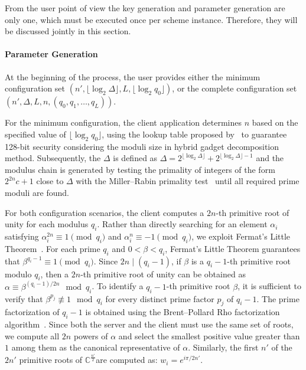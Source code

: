 From the user point of view the key generation and parameter generation are only one, which must be executed once per scheme instance. Therefore, they will be discussed jointly in this section.

\paragraph{Parameter Generation}

At the beginning of the process, the user provides either the minimum configuration set $(n', \lfloor \log_2 \Delta \rfloor, L, \lfloor \log_2 q_0 \rfloor)$, or the complete configuration set $(n', \Delta, L, n, (q_0, q_1, \ldots, q_L))$.

For the minimum configuration, the client application determines $n$ based on the specified value of $\lfloor \log_2 q_0 \rfloor$, using the lookup table proposed by~\cite{al2022openfhe} to guarantee 128-bit security considering the moduli size in hybrid gadget decomposition method. Subsequently, the $\Delta$ is defined as $\Delta = 2^{\lfloor \log_2 \Delta \rfloor} + 2^{\lfloor \log_2 \Delta \rfloor-1}$ and the modulus chain is generated by testing the primality of integers of the form $2^{2n}c + 1$ close to $\Delta$ with the Miller--Rabin primality test~\cite{Rabin1980} until all required prime moduli are found.

For both configuration scenarios, the client computes a $2n$-th primitive root of unity for each modulus $q_i$. Rather than directly searching for an element $\alpha_i$ satisfying $\alpha_i^{2n} \equiv 1 \pmod{q_i}$ and $\alpha_i^n \equiv -1 \pmod{q_i}$, we exploit Fermat's Little Theorem~\cite{HardyWright1979}. For each prime $q_i$ and $0 < \beta < q_i$, Fermat's Little Theorem guarantees that $\beta^{q_i-1} \equiv 1 \pmod{q_i}$. Since $2n \mid (q_i-1)$, if $\beta$ is a $q_i-1$-th primitive root modulo $q_i$, then a $2n$-th primitive root of unity can be obtained as $\alpha \equiv \beta^{(q_i-1)/2n} \mod q_i$. To identify a $q_i-1$-th primitive root $\beta$, it is sufficient to verify that $\beta^{p_j} \not\equiv 1 \mod q_i$ for every distinct prime factor $p_j$ of $q_i-1$. The prime factorization of $q_i-1$ is obtained using the Brent--Pollard Rho factorization algorithm~\cite{Brent1980}. Since both the server and the client must use the same set of roots, we compute all $2n$ powers of $\alpha$ and select the smallest positive value greater than $1$ among them as the canonical representative of $\alpha$. Similarly, the first $n'$ of the $2n'$ primitive roots of $\mathbb{C}^{\frac{n'}{2}}$are computed as: $w_i = e^{i\pi/2n'}$. 

